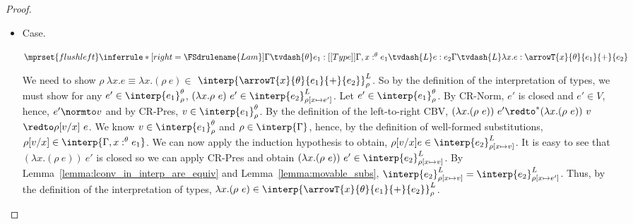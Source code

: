 \begin{proof}
\begin{itemize}
  \item[]Case.\ \\
    \begin{center}
      \begin{math}
        $$\mprset{flushleft}
        \inferrule* [right=\FSdrulename{Lam}] {
          \Gamma \tvdash{\theta} e_1:[[Type]]
          \\\\
          \Gamma,x:^\theta e_1 \tvdash{L} e:e_2
        }{\Gamma \tvdash{L} \lambda x.e:\arrowT{x}{\theta}{e_1}{+}{e_2}}
      \end{math}
    \end{center}
    We need to show 
    $\rho\ \lambda x.e \equiv \lambda x.(\rho\ e) \in $
    $\interp{\arrowT{x}{\theta}{e_1}{+}{e_2}}^{L}_\rho$.  So by the
    definition of the interpretation of types, we must show for any
    $e' \in \interp{e_1}^\theta_\rho$, $(\lambda x.\rho\ e)\ e' \in
    \interp{e_2}^{L}_{\rho[x \mapsto e']}$.  Let $e' \in \interp{e_1}^\theta_\rho$. 
    By CR-Norm, $e'$ is closed and $e' \in V$, hence, $e' \normto v$ and
    by CR-Pres, $v \in \interp{e_1}^\theta_{\rho}$.  By the definition of the
    left-to-right CBV, $(\lambda x.(\rho\ e))\ e' \redto^* (\lambda x.(\rho\ e))\ v $
    $\redto \rho[v/x]\ e$.  We
    know $v \in \interp{e_1}^\theta_\rho$ and $\rho \in
    \interp{\Gamma}$, hence, by the definition of well-formed
    substitutions, $\rho[v/x] \in \interp{\Gamma,x:^\theta e_1}$.  We can now apply the
    induction hypothesis to obtain, $\rho[v/x]e \in
    \interp{e_2}^L_{\rho[x \mapsto v]}$. It is easy to see that $(\lambda
    x.(\rho\ e))\ e'$ is closed so we can apply CR-Pres and
    obtain $(\lambda x.(\rho\ e))\ e' \in
    \interp{e_2}^L_{\rho[x \mapsto v]}$.  By 
    Lemma~\ref{lemma:lconv_in_interp_are_equiv} and Lemma~\ref{lemma:movable_subs},
    $\interp{e_2}^L_{\rho[x \mapsto v]} = \interp{e_2}^L_{\rho[x \mapsto e']}$.
    Thus, by the definition of the
    interpretation of types, $\lambda x.(\rho\ e) \in
    \interp{\arrowT{x}{\theta}{e_1}{+}{e_2}}^{L}_\rho$.


\end{itemize}
\end{proof}
